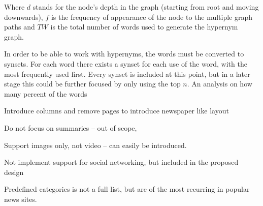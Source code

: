 Where $d$ stands for the node's depth in the graph (starting from root and moving downwards), $f$ is the frequency of appearance of the node to the multiple graph paths and $TW$ is the total number of words used to generate the hypernym graph.

In order to be able to work with hypernyms, the words must be converted to synsets. For each word there exists a synset for each use of the word, with the most frequently used first. Every synset is included at this point, but in a later stage this could be further focused by only using the top $n$. An analysis on how many percent of the words

Introduce columns and remove pages to introduce newspaper like layout

Do not focus on summaries -- out of scope, 

Support images only, not video -- can easily be introduced.

Not implement support for social networking, but included in the proposed design

Predefined categories is not a full list, but are of the most recurring in popular news sites.



